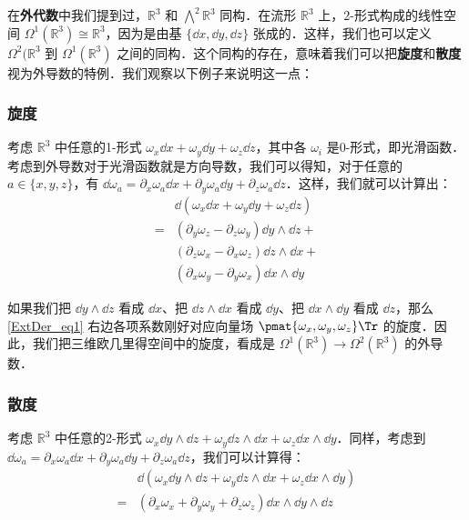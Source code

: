在\textbf{外代数}中我们提到过，$\mathbb{R}^3$ 和 $\bigwedge^2\mathbb{R}^3$ 同构．在流形 $\mathbb{R}^3$ 上，2-形式构成的线性空间 $\Omega^1(\mathbb{R}^3)\cong\mathbb{R}^3$，因为是由基 $\{\dd x, \dd y, \dd z\}$ 张成的．这样，我们也可以定义 $\Omega^2(\mathbb{R}^3$ 到 $\Omega^1(\mathbb{R}^3)$ 之间的同构．这个同构的存在，意味着我们可以把\textbf{旋度}和\textbf{散度}视为外导数的特例．我们观察以下例子来说明这一点：

\subsubsection{旋度}

考虑 $\mathbb{R}^3$ 中任意的1-形式 $\omega_x\dd x+\omega_y\dd y+\omega_z\dd z$，其中各 $\omega_i$ 是0-形式，即光滑函数．考虑到外导数对于光滑函数就是方向导数，我们可以得知，对于任意的 $a\in\{x,y,z\}$，有 $\dd\omega_a=\partial_x\omega_a\dd x+\partial_y\omega_a\dd y+\partial_z\omega_a\dd z$．这样，我们就可以计算出：
\begin{equation}\label{ExtDer_eq1}
\begin{aligned}
&\dd(\omega_x\dd x+\omega_y\dd y+\omega_z\dd z)\\=&(\partial_y\omega_z-\partial_z\omega_y)\dd y\wedge\dd z+\\&(\partial_z\omega_x-\partial_x\omega_z)\dd z\wedge\dd x+\\&(\partial_x\omega_y-\partial_y\omega_x)\dd x\wedge\dd y
\end{aligned}
\end{equation}

如果我们把 $\dd y\wedge\dd z$ 看成 $\dd x$、把 $\dd z\wedge\dd x$ 看成 $\dd y$、把 $\dd x\wedge\dd y$ 看成 $\dd z$，那么\autoref{ExtDer_eq1} 右边各项系数刚好对应向量场 $\pmat{\omega_x, \omega_y, \omega_z}\Tr$ 的旋度．因此，我们把三维欧几里得空间中的旋度，看成是 $\Omega^1(\mathbb{R}^3)\rightarrow\Omega^2(\mathbb{R}^3)$ 的外导数．

\subsubsection{散度}

考虑 $\mathbb{R}^3$ 中任意的2-形式 $\omega_x\dd y\wedge\dd z+\omega_y\dd z\wedge\dd x+\omega_z\dd x\wedge\dd y$．同样，考虑到 $\dd\omega_a=\partial_x\omega_a\dd x+\partial_y\omega_a\dd y+\partial_z\omega_a\dd z$，我们可以计算得：
\begin{equation}\label{ExtDer_eq2}
\begin{aligned}
&\dd(\omega_x\dd y\wedge\dd z+\omega_y\dd z\wedge\dd x+\omega_z\dd x\wedge\dd y)\\=&(\partial_x\omega_x+\partial_y\omega_y+\partial_z\omega_z)\dd x\wedge\dd y\wedge\dd z
\end{aligned}
\end{equation}

